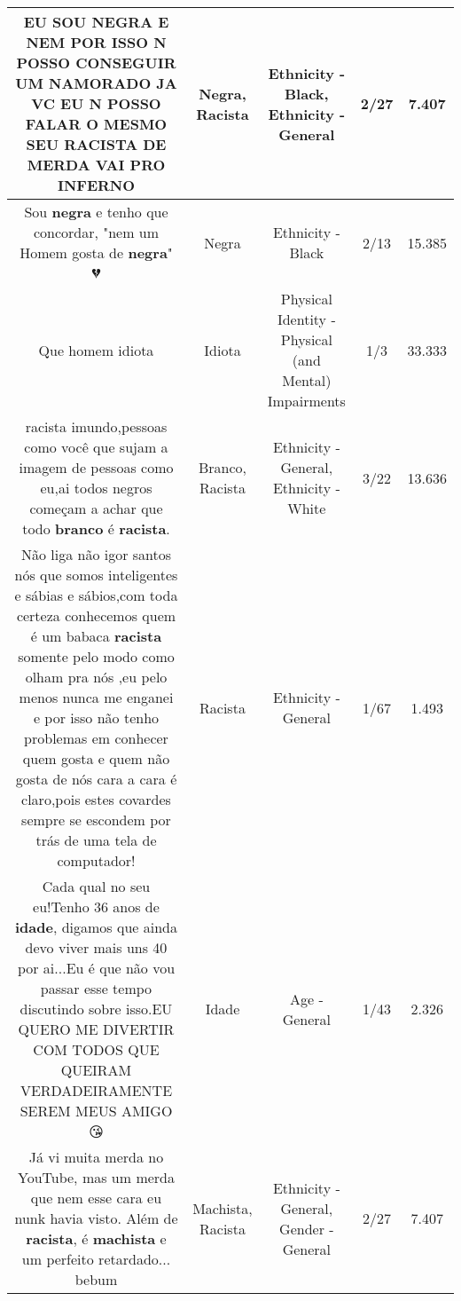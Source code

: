 \documentclass[11pt]{article}
\newlength\mylength
\begin{document}
\begin{center}
\begin{longtable}{|C{.65\mylength}|C{.30\mylength}|C{.12\mylength}|C{.12\mylength}|C{.12\mylength}|}
  \small EU SOU \textbf{NEGRA} E NEM POR ISSO N POSSO CONSEGUIR UM NAMORADO JA VC EU N POSSO FALAR O MESMO SEU \textbf{RACISTA} DE MERDA VAI PRO INFERNO\normalsize   & Negra, Racista & Ethnicity - Black, Ethnicity - General & 2/27 & 7.407 \\  \hline
  \small Sou \textbf{negra} e tenho que concordar, "nem um Homem gosta de \textbf{negra}" 💔\normalsize   & Negra & Ethnicity - Black & 2/13 & 15.385 \\  \hline
  \small Que homem idiota\normalsize   & Idiota & Physical Identity - Physical (and Mental) Impairments & 1/3 & 33.333 \\  \hline
  \small racista imundo,pessoas como você que sujam a imagem de pessoas como eu,ai todos negros começam a achar que todo \textbf{branco} é \textbf{racista}.\normalsize   & Branco, Racista & Ethnicity - General, Ethnicity - White & 3/22 & 13.636 \\  \hline
  \small Não liga não igor santos nós que somos inteligentes e sábias e sábios,com toda certeza conhecemos quem é um babaca \textbf{racista} somente pelo modo como olham pra nós ,eu pelo menos nunca me enganei e por isso não tenho problemas em conhecer quem gosta e quem não gosta de nós cara a cara é claro,pois estes covardes sempre se escondem por trás de uma tela de computador!\normalsize   & Racista & Ethnicity - General & 1/67 & 1.493 \\  \hline
  \small Cada qual no seu eu!Tenho 36 anos de \textbf{idade}, digamos que ainda devo viver mais uns 40 por ai...Eu é que não vou passar esse tempo discutindo sobre isso.EU QUERO ME DIVERTIR COM TODOS QUE QUEIRAM VERDADEIRAMENTE SEREM MEUS AMIGO😘\normalsize   & Idade & Age - General & 1/43 & 2.326 \\  \hline
  \small Já vi muita merda no YouTube, mas um merda que nem esse cara eu nunk havia visto. Além de \textbf{racista}, é \textbf{machista} e um perfeito retardado... bebum\normalsize   & Machista, Racista & Ethnicity - General, Gender - General & 2/27 & 7.407 \\  \hline

\end{longtable}
\end{center}
\end{document}
